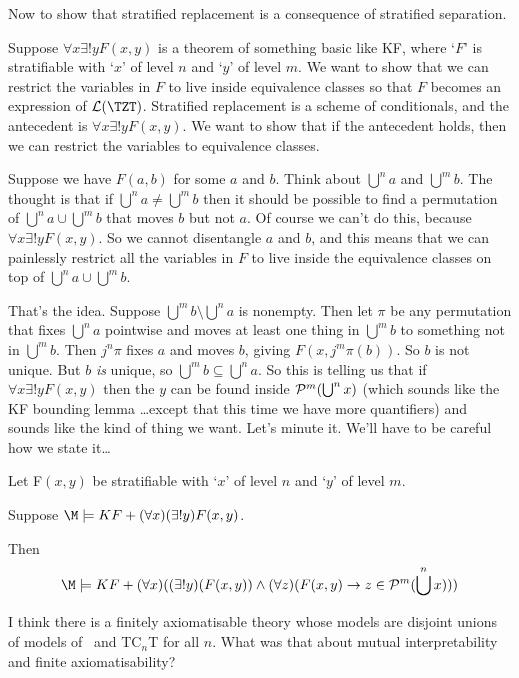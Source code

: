 \documentclass[12pt]{article}
\begin{document}
{\medskip

Now to show that stratified replacement is a consequence of stratified
separation.


Suppose $\forall x \exists!y F(x,y)$ is a theorem of something basic
like KF, where `$F$' is stratifiable with `$x$' of level $n$ and `$y$'
of level $m$.  We want to show that we can restrict the variables in $F$
to live inside equivalence classes so that $F$ becomes an expression of
${\cal L}(\TZT)$.  Stratified replacement is a scheme of conditionals,
and the antecedent is $\forall x \exists! y F(x,y)$.  We want to show
that if the antecedent holds, then we can restrict the variables to
equivalence classes.

Suppose we have $F(a,b)$ for some $a$ and $b$.  Think about $\bigcup^na$
and $\bigcup^m b$.  The thought is that if $\bigcup^n a \not= \bigcup^m b$
then it should be possible to find a permutation of $\bigcup^n a\cup\bigcup^m b$
that moves $b$ but not $a$. Of course we can't do this, because
$\forall x \exists!y F(x,y)$. So we cannot disentangle $a$ and $b$, and this
means that we can painlessly restrict all the variables in $F$ to live inside
the equivalence classes on top of $\bigcup^n a\cup\bigcup^m b$.

That's the idea. Suppose $\bigcup^m b \setminus \bigcup^n a$ is nonempty.
Then let $\pi$ be any permutation that fixes $\bigcup^n a$ pointwise and
moves at least one thing in $\bigcup^m b$ to something not in $\bigcup^m b$.
Then $j^n\pi$ fixes $a$ and moves $b$, giving $F(x,j^m\pi(b))$. So $b$ is
not unique.  But $b$ {\sl is} unique, so $\bigcup^m b \subseteq \bigcup^na$.
So this is telling us that if $\forall x\exists!y F(x,y)$ then the $y$ can
be found inside ${\cal P}^m(\bigcup^n x)$ (which sounds like the KF bounding
lemma \ldots except that this time we have more quantifiers) and sounds like
the kind of thing we want.   Let's minute it.  We'll have to be careful how
we state it\ldots

\begin{rem}\mbox{\negthinspace}
  
  Let F$(x,y)$ be stratifiable with `$x$' of level $n$ and `$y$' of level $m$.

  Suppose $\M \models KF + (\forall x)(\exists!y)F(x,y)$.

  Then    $$\M \models KF + (\forall x)((\exists!y)(F(x,y)) \wedge (\forall z)(F(x , y) \to  z \in {\cal P}^m(\bigcup^n x)))$$\end{rem}
    
    I think there is a finitely axiomatisable theory whose models are
disjoint unions of models of \TZT\ and TC$_n$T for all $n$.  What was
that about mutual interpretability and finite axiomatisability?

}
\end{document}
